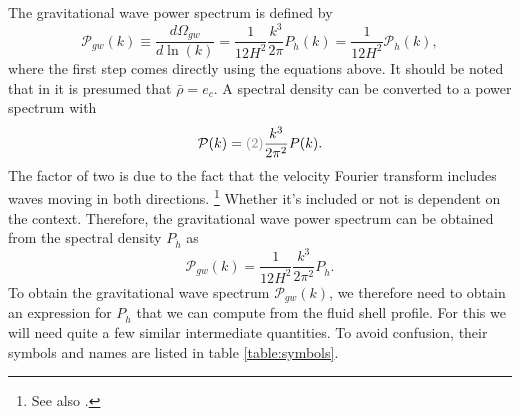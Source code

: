 The gravitational wave power spectrum is defined by
\cite[eq. 3.45]{hindmarsh_gw_pt_2019}
\begin{equation}
\mathcal{P}_{gw}(k)
\equiv \frac{d \Omega_{gw}}{d \ln (k)}
= \frac{1}{12 H^2} \frac{k^3}{2\pi} P_{\dot{h}}(k)
= \frac{1}{12 H^2} \mathcal{P}_{\dot{h}}(k),
\label{eq:gw_pow_spec}
\end{equation}
where the first step comes directly using the equations above.
It should be noted that in \cite[eq. 3.6, eq. 3.46]{hindmarsh_gw_pt_2019} it is presumed that $\bar{\rho}=e_c$.
A spectral density can be converted to a power spectrum with
\cite[eq. 4.18]{hindmarsh_gw_pt_2019}
\begin{equation}
\mathcal{P}(k) = \textcolor{gray}{(2)} \frac{k^3}{2 \pi^2} P(k).
\label{eq:pow_spec}
\end{equation}
The factor of two is due to the fact that the velocity Fourier transform includes waves moving in both directions.%
\footnote{See also \cite[p. 338]{maggiore_gw_2008}.}
Whether it's included or not is dependent on the context.
Therefore, the gravitational wave power spectrum can be obtained from the spectral density $P_\dot{h}$ as
\begin{equation}
\mathcal{P}_{gw}(k) = \frac{1}{12 H^2} \frac{k^3}{2\pi^2} P_{\dot{h}}.
\label{eq:gw_pow_spec2}
\end{equation}
To obtain the gravitational wave spectrum $\mathcal{P}_{gw}(k)$,
we therefore need to obtain an expression for $P_\dot{h}$ that we can compute from the fluid shell profile.
For this we will need quite a few similar intermediate quantities.
To avoid confusion, their symbols and names are listed in table \ref{table:symbols}.

